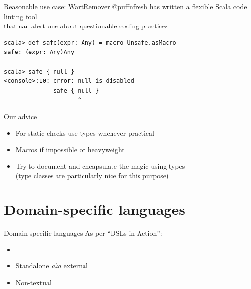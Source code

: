 \documentclass{beamer}
\begin{document}
\begin{frame}[fragile]{Reasonable use case: WartRemover}
  @puffnfresh has written a flexible Scala code linting tool\\
  that can alert one about questionable coding practices

  \vspace{1em}
  \begin{verbatim}
scala> def safe(expr: Any) = macro Unsafe.asMacro
safe: (expr: Any)Any

scala> safe { null }
<console>:10: error: null is disabled
              safe { null }
                     ^
  \end{verbatim}
\end{frame}


\begin{frame}{Our advice}
  \begin{itemize}
  \item For static checks use types whenever practical
  \item Macros if impossible or heavyweight
  \item Try to document and encapsulate the magic using types\\
        (type classes are particularly nice for this purpose)
  \end{itemize}
\end{frame}

  \section{Domain-specific languages}

\begin{frame}{Domain-specific languages}
  As per ``DSLs in Action'':
  \begin{itemize}
    \item {}
    \item Standalone \emph{aka} external
    \item Non-textual
  \end{itemize}
\end{frame}
\end{document}
